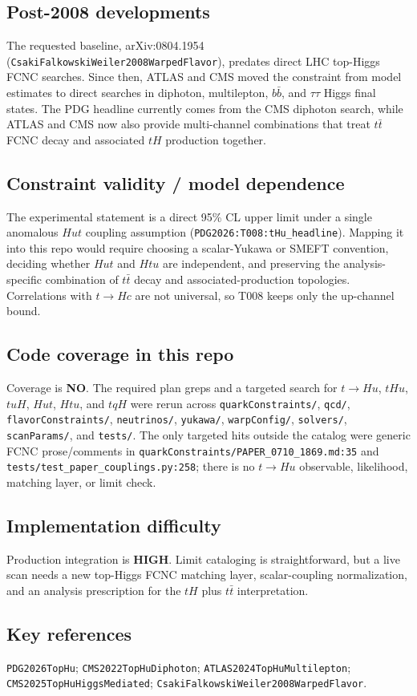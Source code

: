 \subsection*{Post-2008 developments}
The requested baseline, arXiv:0804.1954
(\texttt{CsakiFalkowskiWeiler2008WarpedFlavor}), predates direct LHC
top-Higgs FCNC searches.  Since then, ATLAS and CMS moved the constraint from
model estimates to direct searches in diphoton, multilepton, \(b\bar b\), and
\(\tau\tau\) Higgs final states.  The PDG headline currently comes from the
CMS diphoton search, while ATLAS and CMS now also provide multi-channel
combinations that treat \(t\bar t\) FCNC decay and associated \(tH\)
production together.

\subsection*{Constraint validity / model dependence}
The experimental statement is a direct 95\% CL upper limit under a single
anomalous \(Hut\) coupling assumption (\texttt{PDG2026:T008:tHu\_headline}).
Mapping it into this repo would require
choosing a scalar-Yukawa or SMEFT convention, deciding whether \(Hut\) and
\(Htu\) are independent, and preserving the analysis-specific combination of
\(t\bar t\) decay and associated-production topologies.  Correlations with
\(t\to Hc\) are not universal, so T008 keeps only the up-channel bound.

\subsection*{Code coverage in this repo}
Coverage is \textbf{NO}.  The required plan greps and a targeted search for
\(t\to Hu\), \(tHu\), \(tuH\), \(Hut\), \(Htu\), and \(tqH\) were rerun across
\texttt{quarkConstraints/}, \texttt{qcd/}, \texttt{flavorConstraints/},
\texttt{neutrinos/}, \texttt{yukawa/}, \texttt{warpConfig/},
\texttt{solvers/}, \texttt{scanParams/}, and \texttt{tests/}.  The only
targeted hits outside the catalog were generic FCNC prose/comments in
\texttt{quarkConstraints/PAPER\_0710\_1869.md:35} and
\texttt{tests/test\_paper\_couplings.py:258}; there is no \(t\to Hu\)
observable, likelihood, matching layer, or limit check.

\subsection*{Implementation difficulty}
Production integration is \textbf{HIGH}.  Limit cataloging is straightforward,
but a live scan needs a new top-Higgs FCNC matching layer, scalar-coupling
normalization, and an analysis prescription for the \(tH\) plus \(t\bar t\)
interpretation.

\subsection*{Key references}
\texttt{PDG2026TopHu}; \texttt{CMS2022TopHuDiphoton};
\texttt{ATLAS2024TopHuMultilepton}; \texttt{CMS2025TopHuHiggsMediated};
\texttt{CsakiFalkowskiWeiler2008WarpedFlavor}.

